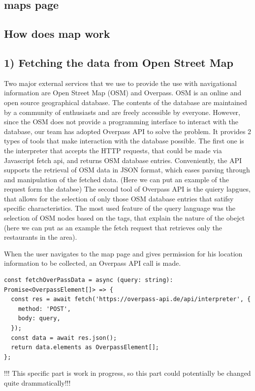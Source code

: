 \subsection{maps page}


\subsection{How does map work}

\subsection{1) Fetching the data from Open Street Map }
Two major external services that we use to provide the use with navigational information are Open Street Map (OSM) and Overpass. OSM is an online and open source geographical database. The contents of the database are maintained by a community of enthusiasts and are freely accessible by everyone. However,  since the OSM does not provide a programming interface to interact with the database, our team has adopted Overpass API to solve the problem. It provides 2 types of tools that make interaction with the database possible. The first one is the interpreter that accepts the HTTP requests, that could be made via Javascript fetch api, and returns OSM database entries. Conveniently, the API supports the retrieval of OSM data in JSON format, which eases parsing through and manipulation of the fetched data. (Here we can put an example of the request form the databse) The second tool of Overpass API is the quiery lapgues, that allows for the selection of only those OSM database entries that satifsy specific characteristics. The most used feature of the query language was the selection of OSM nodes based on the tags, that explain the nature of the obejct (here we can put as an example the fetch request that retrieves only the restaurants in the area). 

When the user navigates to the map page and gives permission for his location information to be collected, an Overpass API call is made.
\begin{verbatim} 
const fetchOverPassData = async (query: string): Promise<OverpassElement[]> => {
  const res = await fetch('https://overpass-api.de/api/interpreter', {
    method: 'POST',
    body: query,
  });
  const data = await res.json();
  return data.elements as OverpassElement[];
};
\end{verbatim}
!!! This specific part is work in progress, so this part could potentially be changed quite drammatically!!!

